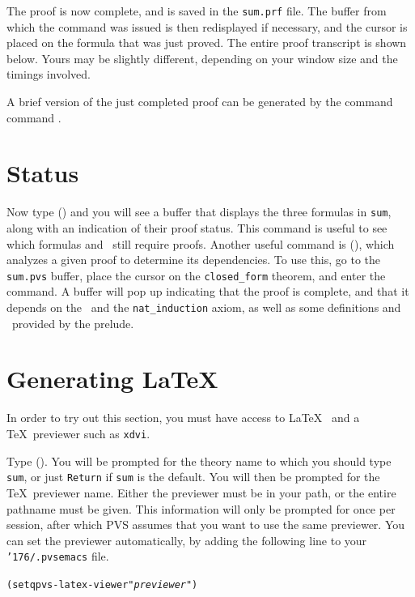 The proof is now complete, and is saved in the \texttt{sum.prf} file.  The
buffer from which the  command was issued is then redisplayed
if necessary, and the cursor is placed on the formula that was just
proved.  The entire proof transcript is shown below.  Yours may be
slightly different, depending on your window size and the timings involved.

{\smaller\smaller
\begin{alltt}

\end{alltt}}

A brief version of the just completed proof can be generated by the command
command .

\section{Status}

Now type  () and you will see a
buffer that displays the three formulas in \texttt{sum}, along with an
indication of their proof status.  This command is useful to see which
formulas and \tccs\ still require proofs.  Another useful command is
 (), which analyzes a given proof to
determine its dependencies.  To use this, go to the \texttt{sum.pvs}
buffer, place the cursor on the \texttt{closed\_form} theorem, and enter
the command.  A buffer will pop up indicating that the proof is
complete, and that it depends on the \tccs\ and the \texttt{nat\_induction}
axiom, as well as some definitions and \tccs\ provided by the prelude.

\section{Generating \LaTeX}

In order to try out this section, you must have access to \LaTeX\
 and a \TeX\ previewer such as
\texttt{xdvi}.

Type  ().  You will be prompted for
the theory name to which you should type \texttt{sum}, or just
\texttt{Return} if \texttt{sum} is the default.  You will then be prompted
for the \TeX\ previewer name.  Either the previewer must be in your path,
or the entire pathname must be given.  This information will only be
prompted for once per session, after which PVS assumes that you want to
use the same previewer.  You can set the previewer automatically,
by adding the following line to your \texttt{\char'176/.pvsemacs} file.
{\small
\begin{alltt}
\hspace*{2em}  (setq pvs-latex-viewer "\textit{previewer}")
\end{alltt}}

